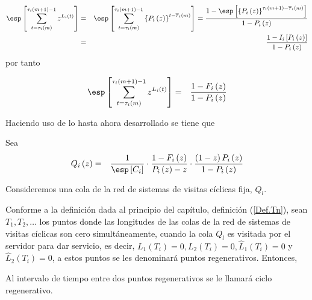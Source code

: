\begin{eqnarray*}
\esp\left[\sum_{t=\tau_{i}\left(m\right)}^{\tau_{i}\left(m+1\right)-1}z^{L_{i}\left(t\right)}\right]&=&\esp\left[\sum_{t=\tau_{i}\left(m\right)}^{\tau_{i}\left(m+1\right)-1}\left\{P_{i}\left(z\right)\right\}^{t-\overline{\tau}_{i}\left(m\right)}\right]=\frac{1-\esp\left[\left\{P_{i}\left(z\right)\right\}^{\tau_{i}\left(m+1\right)-\overline{\tau}_{i}\left(m\right)}\right]}{1-P_{i}\left(z\right)}\\
&=&\frac{1-I_{i}\left[P_{i}\left(z\right)\right]}{1-P_{i}\left(z\right)}
\end{eqnarray*}
por tanto

\begin{eqnarray*}
\esp\left[\sum_{t=\tau_{i}\left(m\right)}^{\tau_{i}\left(m+1\right)-1}z^{L_{i}\left(t\right)}\right]&=&\frac{1-F_{i}\left(z\right)}{1-P_{i}\left(z\right)}
\end{eqnarray*}

Haciendo uso de lo hasta ahora desarrollado se tiene que



Sea 
\begin{eqnarray*}
Q_{i}\left(z\right)&=&\frac{1}{\esp\left[C_{i}\right]}\cdot\frac{1-F_{i}\left(z\right)}{P_{i}\left(z\right)-z}\cdot\frac{\left(1-z\right)P_{i}\left(z\right)}{1-P_{i}\left(z\right)}
\end{eqnarray*}

Consideremos una cola de la red de sistemas de visitas c\'iclicas fija, $Q_{l}$.


Conforme a la definici\'on dada al principio del cap\'itulo, definici\'on (\ref{Def.Tn}), sean $T_{1},T_{2},\ldots$ los puntos donde las longitudes de las colas de la red de sistemas de visitas c\'iclicas son cero simult\'aneamente, cuando la cola $Q_{l}$ es visitada por el servidor para dar servicio, es decir, $L_{1}\left(T_{i}\right)=0,L_{2}\left(T_{i}\right)=0,\hat{L}_{1}\left(T_{i}\right)=0$ y $\hat{L}_{2}\left(T_{i}\right)=0$, a estos puntos se les denominar\'a puntos regenerativos. Entonces, 

\begin{Def}
Al intervalo de tiempo entre dos puntos regenerativos se le llamar\'a ciclo regenerativo.
\end{Def}

